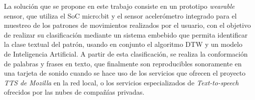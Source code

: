 \hfill \break
\justifying
La solución que se propone en este trabajo consiste en un prototipo \textit{wearable} sensor, que utiliza el SoC micro:bit y el sensor acelerómetro integrado para el muestreo de los patrones de movimientos realizados por el usuario, con el objetivo de realizar su clasificación mediante un sistema embebido que permita identificar la clase textual del patrón, usando en conjunto el algoritmo DTW y un modelo de Inteligencia Artificial. A partir de esta clasificación, se realiza la conformación de palabras y frases en texto, que finalmente son reproducibles sonoramente en una tarjeta de sonido cuando se hace uso de los servicios que ofrecen el proyecto \textit{TTS de Mozilla} en la red local, o los servicios especializados de \textit{Text-to-speech} ofrecidos por las nubes de compañías privadas.


